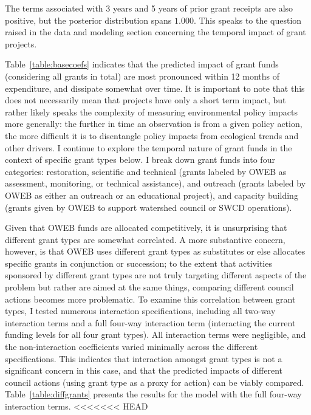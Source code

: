 \documentclass[12pt,a4paper,titlepage]{article}
\begin{document}
The terms associated with 3 years and 5 years of prior grant receipts are also positive, but the posterior distribution spans $1.000$. This speaks to the question raised in the data and modeling section concerning the temporal impact of grant projects. 

Table~\ref{table:basecoefs} indicates that the predicted impact of grant funds (considering all grants in total) are most pronounced within 12 months of expenditure, and dissipate somewhat over time. It is important to note that this does not necessarily mean that projects have only a short term impact, but rather likely speaks the complexity of measuring environmental policy impacts more generally: the further in time an observation is from a given policy action, the more difficult it is to disentangle policy impacts from ecological trends and other drivers. I continue to explore the temporal nature of grant funds in the context of specific grant types below. I break down grant funds into four categories: restoration, scientific and technical (grants labeled by OWEB as assessment, monitoring, or technical assistance), and outreach (grants labeled by OWEB as either an outreach or an educational project), and capacity building (grants given by OWEB to support watershed council or SWCD operations). 

Given that OWEB funds are allocated competitively, it is unsurprising that different grant types are somewhat correlated. A more substantive concern, however, is that OWEB uses different grant types as substitutes or else allocates specific grants in conjunction or succession; to the extent that activities sponsored by different grant types are not truly targeting different aspects of the problem but rather are aimed at the same things, comparing different council actions becomes more problematic. To examine this correlation between grant types, I tested numerous interaction specifications, including all two-way interaction terms and a full four-way interaction term (interacting the current funding levels for all four grant types). All interaction terms were negligible, and the non-interaction coefficients varied minimally across the different specifications. This indicates that interaction amongst grant types is not a significant concern in this case, and that the predicted impacts of different council actions (using grant type as a proxy for action) can be viably compared. Table~\ref{table:diffgrants} presents the results for the model with the full four-way interaction terms. 
<<<<<<< HEAD
\end{document}
